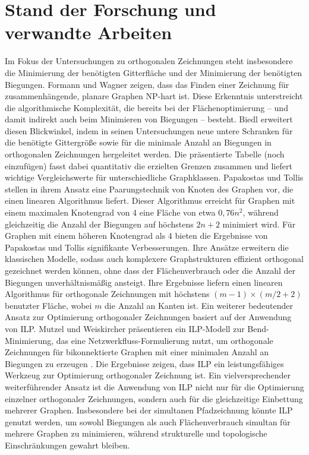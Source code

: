 \documentclass[bachelor, german]{algothesis}
\begin{document}
\section{Stand der Forschung und verwandte Arbeiten}
Im Fokus der Untersuchungen zu orthogonalen Zeichnungen steht insbesondere die Minimierung der benötigten Gitterfläche und der Minimierung der benötigten Biegungen. Formann und Wagner \cite{NP-orth} zeigen, dass das Finden einer  Zeichnung für zusammenhängende, planare Graphen NP-hart ist. Diese Erkenntnis unterstreicht die algorithmische Komplexität, die bereits bei der Flächenoptimierung – und damit indirekt auch beim Minimieren von Biegungen – besteht.\newline
Biedl \cite{Biedl} erweitert diesen Blickwinkel, indem in seinen Untersuchungen neue untere Schranken für die benötigte Gittergröße sowie für die minimale Anzahl an Biegungen in orthogonalen Zeichnungen hergeleitet werden. Die präsentierte Tabelle (noch einzufügen) fasst dabei quantitativ die erzielten Grenzen zusammen und liefert wichtige Vergleichswerte für unterschiedliche Graphklassen.\newline
Papakostas und Tollis \cite{Pairing} stellen in ihrem Ansatz eine Paarungstechnik von Knoten des Graphen vor, die einen linearen Algorithmus liefert. Dieser Algorithmus erreicht für Graphen mit einem maximalen Knotengrad von 4 eine Fläche von etwa $0,76n^2$, während gleichzeitig die Anzahl der Biegungen  auf höchstens $2n+2$ minimiert wird. Für Graphen mit einem höheren Knotengrad als 4 bieten die Ergebnisse von Papakostas und Tollis \cite{Papakostas2000} signifikante Verbesserungen. Ihre Ansätze erweitern die klassischen Modelle, sodass auch komplexere Graphstrukturen effizient orthogonal gezeichnet werden können, ohne dass der Flächenverbrauch oder die Anzahl der Biegungen unverhältnismäßig ansteigt. Ihre Ergebnisse liefern einen linearen Algorithmus für orthogonale Zeichnungen mit höchstens $(m-1)\times (m/2 + 2)$ benutzter Fläche, wobei $m$ die Anzahl an Kanten ist.\newline
Ein weiterer bedeutender Ansatz zur Optimierung orthogonaler Zeichnungen basiert auf der Anwendung von ILP. Mutzel und Weiskircher präsentieren ein ILP-Modell zur Bend-Minimierung, das eine Netzwerkfluss-Formulierung nutzt, um orthogonale Zeichnungen für bikonnektierte Graphen mit einer minimalen Anzahl an Biegungen zu erzeugen \cite{ILPBEND}.\newline
Die Ergebnisse zeigen, dass ILP ein leistungsfähiges Werkzeug zur Optimierung orthogonaler Zeichnung ist. Ein vielversprechender weiterführender Ansatz ist die Anwendung von ILP nicht nur für die Optimierung einzelner orthogonaler Zeichnungen, sondern auch für die gleichzeitige Einbettung mehrerer Graphen. Insbesondere bei der simultanen Pfadzeichnung könnte ILP genutzt werden, um sowohl Biegungen als auch Flächenverbrauch simultan für mehrere Graphen zu minimieren, während strukturelle und topologische Einschränkungen gewahrt bleiben.
\end{document}
